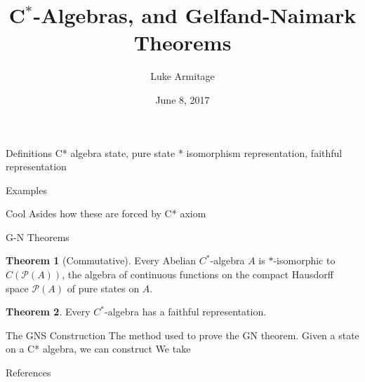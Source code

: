 \documentclass[11pt]{beamer}
\author{Luke Armitage}
\title{C$^\ast$-Algebras, and Gelfand-Naimark Theorems}
\institute{University of York}
\date{June 8, 2017}
\theoremstyle{definition}
\theoremstyle{theorem}
\newtheorem{thm}{Theorem}
\renewcommand{\P}[1]{\mathscr{P}(#1)}
\begin{document}
\begin{frame}
\titlepage
\end{frame}

\begin{frame} {Definitions}
	C* algebra
	state, pure state
	* isomorphism
	representation, faithful representation
\end{frame}

\begin{frame} {Examples}
	
\end{frame}

\begin{frame} {Cool Asides}
	how these are forced by C* axiom
\end{frame}

\begin{frame} {G-N Theorems}
	\begin{thm}[Commutative]
		Every Abelian $C^\ast$-algebra $A$ is $\ast$-isomorphic to $C(\P A)$, the 
		algebra of continuous functions on the compact Hausdorff space $\P A$ of pure 
		states on $A$.
	\end{thm}
	\pause
	\begin{thm}
		Every $C^\ast$-algebra has a faithful representation.
	\end{thm}
\end{frame}

\begin{frame} {The GNS Construction}
	The method used to prove the GN theorem. Given a state on a C* algebra, we can construct 
	We take 
\end{frame}

\begin{frame} {References}
	
\end{frame}
\end{document}
